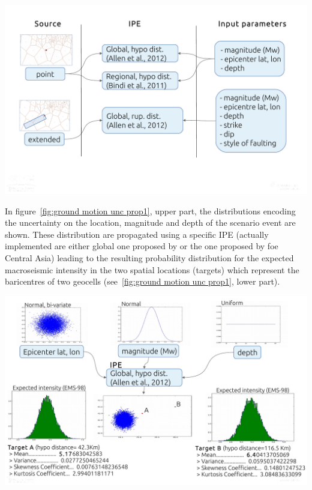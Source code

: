 \documentclass[12p]{article}
\begin{document}
\begin{center}
	\includegraphics[trim=0mm 30mm 0mm 0mm,clip,
width=\textwidth]{ground_motion_unc_prop2}
\end{center}

In figure~\ref{fig:ground motion unc prop1}, upper part, the distributions
encoding the uncertainty on the location, magnitude and depth of the scenario
event are shown. These distribution are propagated using a specific IPE
(actually implemented are either global one proposed by
\cite{allen_intensity_2012} or the one proposed by \cite{bindi_intensity_2011}
foe Central Asia) leading to the resulting probability distribution for the
expected macroseismic intensity in the two spatial locations (targets) which
represent the baricentres of two geocells (see~\ref{fig:ground motion unc
prop1}, lower part).


\begin{center}
	\includegraphics[width=\textwidth]{ground_motion_unc_prop1}
\end{center}
\end{document}
